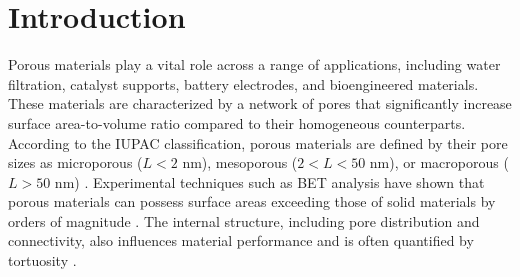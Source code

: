 
\section{Introduction}
\label{section:introduction}

Porous materials play a vital role across a range of applications, including water filtration, catalyst supports, battery electrodes, and bioengineered 
materials. These materials are characterized by a network of pores that significantly increase surface area-to-volume ratio compared to their 
homogeneous counterparts. According to the IUPAC classification, porous materials are defined by their pore sizes as microporous ($L < 2$ nm), 
mesoporous ($2 < L < 50$ nm), or macroporous ($L > 50$ nm) \cite{sing_reporting_1985}. Experimental techniques such as BET analysis have shown 
that porous materials can possess surface areas exceeding those of solid materials by orders of magnitude \cite{shimizu_surface_2022}. The internal 
structure, including pore distribution and connectivity, also influences material performance and is often quantified by tortuosity 
\cite{chen_tortuosity_2020, ebner_tortuosity_2014}.

